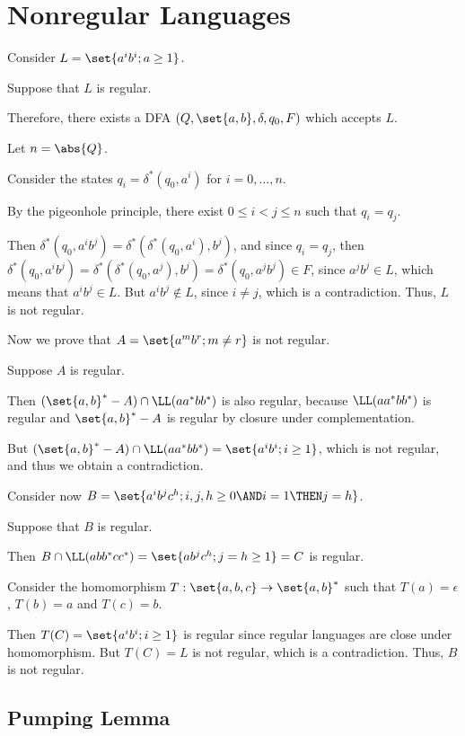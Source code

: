 \documentclass[11pt]{scrartcl}
\begin{document}
\section{Nonregular Languages}

Consider $L = \set{a^ib^i; a \geq 1}$.

Suppose that $L$ is regular. 

Therefore, there exists a DFA $(Q, \set{a, b}, \delta,q_0, F)$ which
accepts $L$.

Let $n = \abs{Q}$.

Consider the states $q_{i} = \delta^{*}(q_0, a^i)$ for $i = 0, \dots, n$.

By the pigeonhole principle, there exist $0 \leq i < j \leq n$ such
that $q_i = q_j$.

Then
$\delta^{*}(q_0, a^ib^j) = \delta^{*}(\delta^{*}(q_0, a^i), b^j)$, and
since $q_i = q_j$, then
$\delta^{*}(q_0, a^ib^j) = \delta^{*}(\delta^{*}(q_0, a^j), b^j) =
\delta^{*}(q_0, a^jb^j) \in F$, since $a^jb^j \in L$, which means that
$a^ib^j\in L$. But $a^ib^j\not \in L$, since $i\neq j$, which is a
contradiction. Thus, $L$ is not regular.

Now we prove that $A = \set{a^mb^r; m\neq r}$ is not regular.

Suppose $A$ is regular.

Then $(\set{a, b}^{*} - A)\cap \LL(aa^{*}bb^{*})$ is also regular,
because $\LL(aa^{*}bb^{*})$ is regular and $\set{a, b}^{*}-A$ is
regular by closure under complementation. 

But
$(\set{a, b}^{*} - A)\cap \LL(aa^{*}bb^{*}) = \set{a^ib^i; i \geq 1}$,
which is not regular, and thus we obtain a contradiction.

Consider now
$B = \set{a^ib^jc^h; i, j, h \geq 0 \AND i=1 \THEN j = h}$.

Suppose that $B$ is regular.

Then $B\cap \LL(abb^{*}cc^{*}) = \set{ab^jc^h; j =h \geq 1} = C$ is
regular.

Consider the homomorphism $T: \set{a, b, c} \to \set{a, b}^{*}$ such
that $T(a) = \epsilon$, $T(b) = a$ and $T(c) = b$.

Then $T(C) = \set{a^ib^i; i\geq 1}$ is regular since regular languages
are close under homomorphism. But $T(C) = L$ is not regular, which is
a contradiction. Thus, $B$ is not regular.

\subsection{Pumping Lemma}
\end{document}
